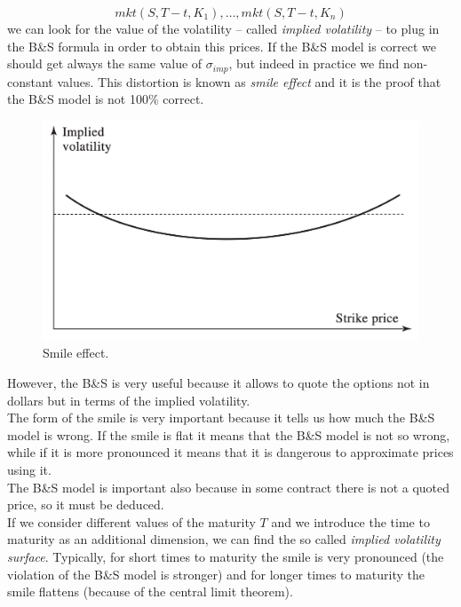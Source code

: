$$mkt(S,T-t,K_1),\dots,mkt(S,T-t,K_n)$$
we can look for the value of the volatility -- called \emph{implied volatility} -- to plug in the B\&S formula in order to obtain this prices. If the B\&S model is correct we should get always the same value of $\sigma_{imp}$, but indeed in practice we find non-constant values. This distortion is known as \emph{smile effect} and it is the proof that the B\&S model is not 100\% correct.
\begin{figure}[htp]
    \centering
    \includegraphics[scale=0.2]{fig/tmp/fig18.png}
    \caption{Smile effect.}
    \label{fig:smile}
\end{figure}
\newline However, the B\&S is very useful because it allows to quote the options not in dollars but in terms of the implied volatility.\\
The form of the smile is very important because it tells us how much the B\&S model is wrong. If the smile is flat it means that the B\&S model is not so wrong, while if it is more pronounced it means that it is dangerous to approximate prices using it.\\
The B\&S model is important also because in some contract there is not a quoted price, so it must be deduced.\\
If we consider different values of the maturity $T$ and we introduce the time to maturity as an additional dimension, we can find the so called \emph{implied volatility surface}. Typically, for short times to maturity the smile is very pronounced (the violation of the B\&S model is stronger) and for longer times to maturity the smile flattens (because of the central limit theorem).
